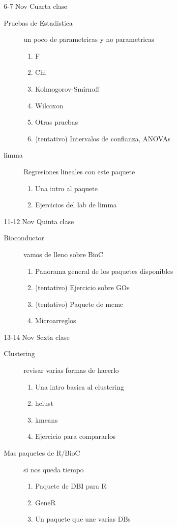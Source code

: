 \documentclass[letterpaper,12pt]{article}
\begin{document}
\begin{itemize}
\item[6-7 Nov] Cuarta clase
  \begin{description}
  \item[Pruebas de Estadistica] un poco de parametricas y no parametricas
    \begin{enumerate}
      \item F
	  \item Chi
      \item Kolmogorov-Smirnoff
      \item Wilcoxon
	  \item Otras pruebas
	  \item (tentativo) Intervalos de confianza, ANOVAs
    \end{enumerate}
  \item[limma] Regresiones lineales con este paquete
    \begin{enumerate}
    \item Una intro al paquete
    \item Ejercicios del lab de limma
    \end{enumerate}
  \end{description}

\item[11-12 Nov] Quinta clase
  \begin{description}
  \item[Bioconductor] vamos de lleno sobre BioC 
    \begin{enumerate}
      \item Panorama general de los paquetes disponibles
      \item (tentativo) Ejercicio sobre GOs
	  \item (tentativo) Paquete de mcmc
      \item Microarreglos
    \end{enumerate}
  \end{description}

\item[13-14 Nov] Sexta clase
  \begin{description}
  \item[Clustering] revisar varias formas de hacerlo 
    \begin{enumerate}
      \item Una intro basica al clustering
      \item hclust
      \item kmeans
      \item Ejercicio para compararlos
    \end{enumerate}
   \item[Mas paquetes de R/BioC] si nos queda tiempo
     \begin{enumerate}
	   \item Paquete de DBI para R
	   \item GeneR
	   \item Un paquete que une varias DBs
	 \end{enumerate}
  \end{description}

	
\end{itemize}
\end{document}
